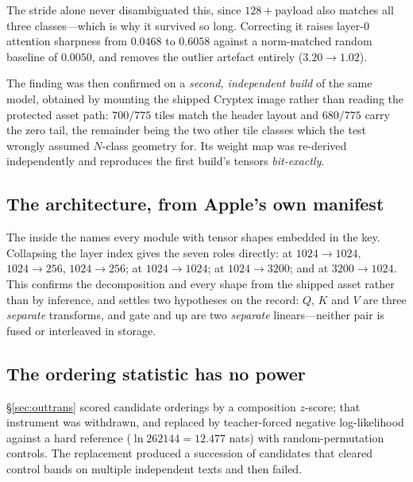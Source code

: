 \noindent The stride alone never disambiguated this, since $128 + \text{payload}$ also matches all
three classes---which is why it survived so long. Correcting it raises layer-$0$ attention sharpness
from $0.0468$ to $0.6058$ against a norm-matched random baseline of $0.0050$, and removes the outlier
artefact entirely ($3.20\rightarrow1.02$).

The finding was then confirmed on a \emph{second, independent build} of the same model, obtained by
mounting the shipped Cryptex image rather than reading the protected asset path: $700/775$ tiles
match the header layout and $680/775$ carry the zero tail, the remainder being the two other tile
classes which the test wrongly assumed $N$-class geometry for. Its weight map was re-derived
independently and reproduces the first build's tensors \emph{bit-exactly}.

\subsection{The architecture, from Apple's own manifest}

The  inside the  names every module with tensor shapes
embedded in the key. Collapsing the layer index gives the seven roles directly:
  at $1024\!\to\!1024$, $1024\!\to\!256$,
$1024\!\to\!256$;  at $1024\!\to\!1024$;
 at $1024\!\to\!3200$; and
 at $3200\!\to\!1024$. This confirms the decomposition and
every shape from the shipped asset rather than by inference, and settles two hypotheses on the
record: $Q$, $K$ and $V$ are three \emph{separate} transforms, and gate and up are two \emph{separate}
linears---neither pair is fused or interleaved in storage.

\subsection{The ordering statistic has no power}

\S\ref{sec:outtrans} scored candidate orderings by a composition $z$-score; that instrument was
withdrawn, and replaced by teacher-forced negative log-likelihood against a hard reference
($\ln 262144 = 12.477$ nats) with random-permutation controls. The replacement produced a succession
of candidates that cleared control bands on multiple independent texts and then failed.

